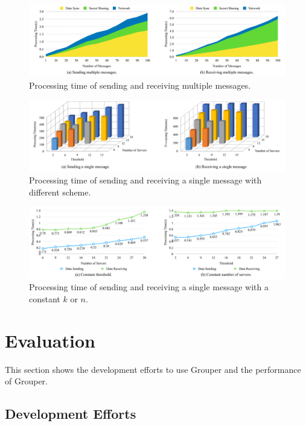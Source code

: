 \documentclass[twocolumn,10pt]{article}
\begin{document}
\begin{figure}[t]
	\centering
	\includegraphics[scale=0.13]{multiple_messages}
	\caption{Processing time of sending and receiving multiple messages.}
\end{figure}

\begin{figure}[t]
	\centering
	\includegraphics[scale=0.35]{3d}
	\caption{Processing time of sending and receiving a single message with different scheme.}
\end{figure}

\begin{figure}[t]
	\centering
	\includegraphics[scale=0.13]{constant_k_n}
	\caption{Processing time of sending and receiving a single message with a constant ${k}$ or ${n}$.}
\end{figure}

\section{Evaluation}

This section shows the development efforts to use Grouper and the performance of Grouper.

\subsection{Development Efforts}
\end{document}
